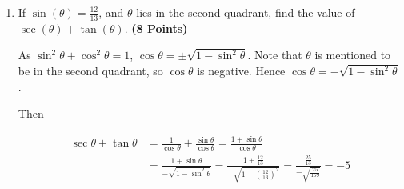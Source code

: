 \documentclass[12pt, xcolor=dvipsnames,svgnames,x11names]{article}
\begin{document}
\begin{enumerate}
\begin{tcolorbox}
Since $\sin^2\theta + \cos^2\theta = 1$ by trigonometric identiies,  $2(\sin^2 \theta + \cos^2 \theta)$ is simply $2$.
    
\end{tcolorbox}


\item If $\sin(\theta) = \frac{12}{13}$, and $\theta$ lies in the second quadrant, find the value of $\sec(\theta) + \tan (\theta)$. \hfill \textbf{(8 Points)}

\begin{tcolorbox}[
    enhanced,
    colback=androidBlueLight!80,
    colframe=androidBlue,
    arc=5pt,
    boxrule=1pt,
    title=\textbf{Answer},
    fonttitle=\bfseries,
    coltitle=black,
    top=10pt,
    bottom=8pt,
    left=8pt,
    right=8pt,
    attach boxed title to top left={xshift=10pt, yshift=-\tcboxedtitleheight/2},
    boxed title style={
    colback=androidBlue,    
        colframe=androidBlue,
        arc=3pt,
        boxrule=0pt,
        left=6pt, right=6pt,
        top=3pt, bottom=3pt
    }
    ]
    

As  $\sin^2\theta + \cos^2\theta = 1$, $\cos\theta  = \pm \sqrt{1 - \sin^2 \theta}$. Note that $\theta$ is mentioned to be in the second quadrant, so $\cos\theta$ is negative. Hence $\cos\theta  = - \sqrt{1 - \sin^2 \theta}$. 

Then 

\begin{align}
\sec \theta + \tan \theta & = \frac{1}{\cos \theta} + \frac{\sin \theta}{\cos \theta} = \frac{1 + \sin \theta}{\cos \theta}\\
& = \frac{1 + \sin \theta}{- \sqrt{1 - \sin^2 \theta}} = \frac{1 + \frac{12}{13}}{- \sqrt{1 - (\tfrac{12}{13})^2}} = \frac{\tfrac{25}{13}}{-\sqrt{\tfrac{25}{169}}} = -5
\end{align}
    
\end{tcolorbox}



\end{enumerate}
\end{document}
